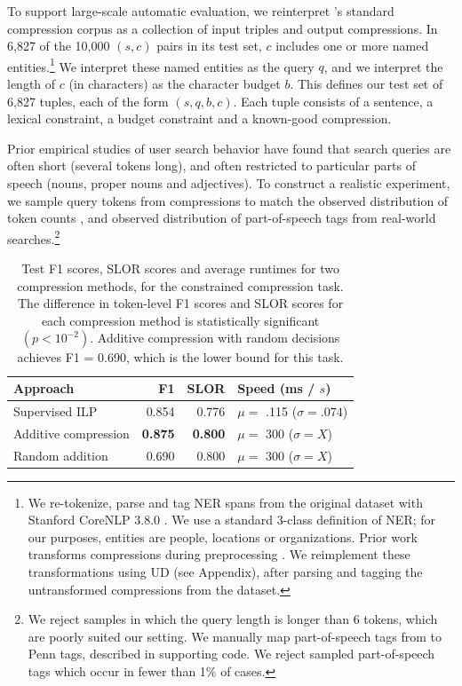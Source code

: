 \documentclass[11pt,a4paper]{article}
\begin{document}
To support large-scale automatic evaluation, we reinterpret 
\citeauthor{filippova2013overcoming}'s
standard compression corpus
as a collection of input triples and output compressions.
In 6,827 of the 10,000 $(s,c)$ pairs in its test set,
$c$ includes one or more named entities.\footnote{We re-tokenize, parse and tag NER spans from the original dataset with Stanford CoreNLP 3.8.0 \cite{corenlp}. We use a standard 3-class definition of NER; for our purposes, entities are people, locations or organizations. Prior work transforms compressions during preprocessing \cite{filippova2013overcoming}. We reimplement these transformations using UD (see Appendix), after parsing and tagging the untransformed compressions from the dataset.}
We interpret these named entities as the query $q$,
and we interpret the length of $c$ (in characters) as the character budget $b$.
This defines our test set of 6,827 tuples, each of the form $(s,q,b,c)$. Each tuple consists of a sentence, a lexical constraint, a budget constraint and a
known-good compression.

Prior empirical studies of user search behavior have found that search queries are often short (several tokens long), and often restricted to particular parts of speech (nouns, proper nouns and adjectives). To construct a realistic experiment, we sample query tokens from compressions to match the observed distribution of token counts \cite[table 6] {Jansen2000RealLR}, and observed distribution of part-of-speech tags \cite{Barr2008TheLS} from real-world searches.\footnote{We reject samples in which the query length is longer than 6 tokens, which are poorly suited our setting. We manually map part-of-speech tags from \citet{Barr2008TheLS} to Penn tags, described in supporting code. We reject sampled part-of-speech tags which occur in fewer than 1\% of cases.}

\begin{table}[]
\begin{tabular}{lrrl}
\centering
Approach & F1 & SLOR &  Speed {\small (ms / $s$)}  \\ \hline
Supervised ILP &  {\small 0.854}   &  {\small 0.776 }  & {\small $\mu=$ .115} ({\small $ \sigma=.074$}) \\
Additive compression &  {\small \textbf{0.875}}  & {\small \textbf{0.800} }& {\small $\mu=$ 300} ({\small $ \sigma=X$}) \\
Random addition  &  {\small 0.690}  & {\small 0.800 }& {\small $\mu=$ 300} ({\small $ \sigma=X$}) \\
\end{tabular}
\caption{Test F1 scores, SLOR scores and average runtimes for two compression methods, for the constrained compression task. The difference in token-level F1 scores and SLOR scores for each compression method is statistically significant {\small $(p < 10^{-2})$}. Additive compression with random decisions achieves F1 = 0.690, which is the lower bound for this task.}
\label{t:results}
\end{table}
\end{document}
